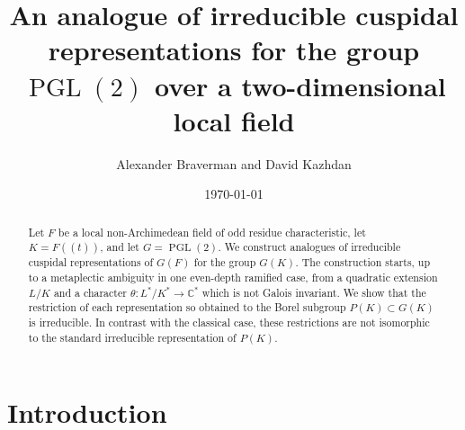 \documentclass[11pt,a4paper,twoside]{amsart}
\theoremstyle{definition}
\theoremstyle{remark}
\newcommand{\CC}{\mathbb C}
\newcommand{\PGL}{\operatorname{PGL}}
\begin{document}
\title[Cuspidal representations over a two-dimensional local field]{An analogue of irreducible cuspidal representations for the group $\PGL(2)$ over a two-dimensional local field}
\author{Alexander Braverman and David Kazhdan}
\date{\today}
\begin{abstract}
Let $F$ be a local non-Archimedean field of odd residue characteristic, let $K=F((t))$, and let $G=\PGL(2)$. We construct analogues of irreducible cuspidal representations of $G(F)$ for the group $G(K)$. The construction starts, up to a metaplectic ambiguity in one even-depth ramified case, from a quadratic extension $L/K$ and a character $\theta:L^*/K^*\to\CC^*$ which is not Galois invariant. We show that the restriction of each representation so obtained to the Borel subgroup $P(K)\subset G(K)$ is irreducible. In contrast with the classical case, these restrictions are not isomorphic to the standard irreducible representation of $P(K)$.
\end{abstract}
\maketitle
\section{Introduction}
\end{document}
